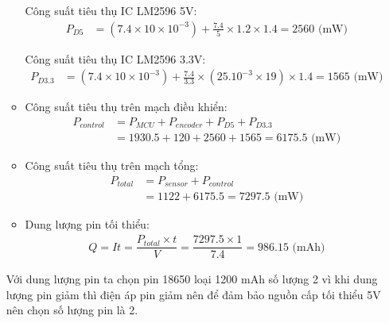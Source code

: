 \begin{itemize}
\begin{itemize}
                        Công suất tiêu thụ IC LM2596 5V:
                        \begin{align*}
                            P_{D5} &= (7.4 \times 10 \times 10^{-3}) + \frac{7.4}{5} \times 1.2 \times 1.4 \nonumber = 2560 \text{ (mW)}
                        \end{align*}

                        Công suất tiêu thụ IC LM2596 3.3V:
                        \begin{align*}
                            P_{D3.3} &= (7.4 \times 10 \times 10^{-3}) + \frac{7.4}{3.3} \times (25.10^{-3} \times 19) \times 1.4 \nonumber = 1565 \text{ (mW)}
                        \end{align*}
                        \item Công suất tiêu thụ trên mạch điều khiển:
                        \begin{align}
                            P_{control} &= P_{MCU} + P_{encoder} + P_{D5} + P_{D3.3} \\
                            &= 1930.5 + 120 + 2560 + 1565 = 6175.5 \text{ (mW)}
                        \end{align}
                        \item Công suất tiêu thụ trên mạch tổng:
                        \begin{align}
                            P_{total} &= P_{sensor} + P_{control} \\
                            &= 1122 + 6175.5 = 7297.5 \text{ (mW)}
                        \end{align}
                        \item Dung lượng pin tối thiểu:
                        \begin{align}
                            Q = It = \dfrac{P_{total} \times t}{V} = \dfrac{7297.5 \times 1}{7.4} = 986.15 \text{ (mAh)}
                        \end{align}
                    \end{itemize}
                    \hspace{0.6cm}Với dung lượng pin ta chọn pin 18650 loại 1200 mAh số lượng 2 vì khi dung lượng pin giảm thì điện áp pin giảm nên để đảm bảo nguồn cấp tối thiểu 5V nên chọn số lượng pin là 2.
                \end{itemize}
